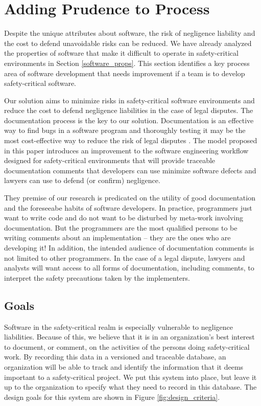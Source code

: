 \section{Adding Prudence to Process}\label{solution}
Despite the unique attributes about software, the risk of negligence liability
and the cost to defend unavoidable risks can be reduced. We have already
analyzed the properties of software that make it difficult to operate in
safety-critical environments in Section \ref{software_props}. This section
identifies a key process area of software development that needs improvement if
a team is to develop safety-critical software.

Our solution aims to minimize risks in safety-critical software environments and
reduce the cost to defend negligence liabilities in the case of legal disputes.
The documentation process is the key to our solution. Documentation is an
effective way to find bugs in a software program and thoroughly testing it may
be the most cost-effective way to reduce the risk of legal disputes
\cite{Kaner_doc_1995}. The model proposed in this paper introduces an
improvement to the software engineering workflow designed for safety-critical
environments that will provide traceable documentation comments that developers
can use minimize software defects and lawyers can use to defend (or confirm)
negligence.

They premise of our research is predicated on the utility of good documentation
and the foreseeabe habits of software developers. In practice, programmers just
want to write code and do not want to be disturbed by meta-work involving
documentation. But the programmers are the most qualified persons to be writing
comments about an implementation -- they are the ones who are developing it! In
addition, the intended audience of documentation comments is not limited to
other programmers. In the case of a legal dispute, lawyers and analysts will
want access to all forms of documentation, including comments, to interpret the
safety precautions taken by the implementers.

\subsection{Goals}
Software in the safety-critical realm is especially vulnerable to negligence
liabilities. Because of this, we believe that it is in an organization's best
interest to document, or comment, on the activities of the persons doing
safety-critical work. By recording this data in a versioned and traceable 
database, an organization will be able to track and identify the information
that it deems important to a safety-critical project. We put this system into
place, but leave it up to the organization to specify what they need to record
in this database. The design goals for this system are shown in Figure 
\ref{fig:design_criteria}.

